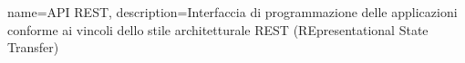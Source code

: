 {
    name={API REST},
    description={Interfaccia di programmazione delle applicazioni conforme ai vincoli dello stile architetturale REST (REpresentational State Transfer)}
}